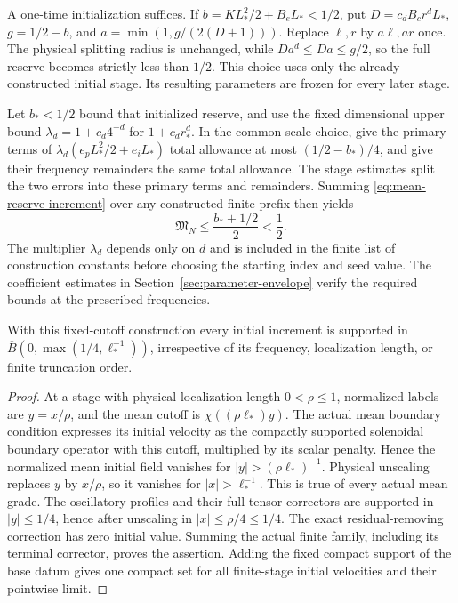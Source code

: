 A one-time initialization suffices. If
$b=K L_*^2/2+B_e L_*<1/2$, put
$D=c_dB_c r^dL_*$, $g=1/2-b$, and
$a=\min(1,g/(2(D+1)))$. Replace $\ell,r$ by $a\ell,ar$ once.
The physical splitting radius is unchanged, while
$Da^d\leq Da\leq g/2$, so the full reserve becomes strictly less
than $1/2$. This choice uses only the already constructed initial
stage. Its resulting parameters are frozen for every later stage.

Let $b_*<1/2$ bound that initialized reserve, and use the fixed
dimensional upper bound $\lambda_d=1+c_d4^{-d}$ for $1+c_dr_*^d$.
In the common scale choice, give the primary terms of
$\lambda_d(e_p L_*^2/2+e_iL_*)$ total allowance at most
$(1/2-b_*)/4$, and give their frequency remainders the same total
allowance. The stage estimates split the two errors into these primary
terms and remainders. Summing \eqref{eq:mean-reserve-increment} over
any constructed finite prefix then yields
\[
 \mathfrak M_N\leq\frac{b_*+1/2}{2}<\frac12.
\]
The multiplier $\lambda_d$ depends only on $d$ and is included in the
finite list of construction constants before choosing the starting index
and seed value. The coefficient estimates in
Section~\ref{sec:parameter-envelope} verify the required bounds at the
prescribed frequencies.

\begin{lemma}\label{lem:common-support}
With this fixed-cutoff construction every initial increment is supported
in $\overline B(0,\max(1/4,\ell_*^{-1}))$, irrespective of its
frequency, localization length, or finite truncation order.
\end{lemma}
\begin{proof}
At a stage with physical localization length $0<\rho\leq1$, normalized
labels are $y=x/\rho$, and the mean cutoff is
$\chi((\rho\ell_*)y)$. The actual mean boundary condition expresses
its initial velocity as the compactly supported solenoidal boundary
operator with this cutoff, multiplied by its scalar penalty.
Hence the normalized mean initial field vanishes for
$|y|>(\rho\ell_*)^{-1}$. Physical unscaling replaces $y$ by $x/\rho$,
so it vanishes for $|x|>\ell_*^{-1}$. This is true of every actual
mean grade. The oscillatory profiles and their full tensor correctors
are supported in $|y|\leq1/4$, hence after unscaling in
$|x|\leq\rho/4\leq1/4$. The exact residual-removing correction has
zero initial value. Summing the actual finite family, including its
terminal corrector, proves the assertion. Adding the fixed compact
support of the base datum gives one compact set for all finite-stage
initial velocities and their pointwise limit.
\end{proof}
